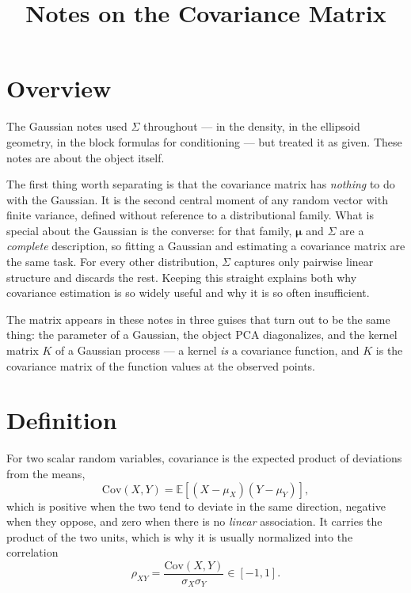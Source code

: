 \documentclass[conference]{IEEEtran}
\title{Notes on the Covariance Matrix}
\author{
\IEEEauthorblockN{Luis Mendez}
}
\begin{document}
\maketitle

\section*{Overview}
The Gaussian notes used $\Sigma$ throughout --- in the density, in the ellipsoid geometry, in the block formulas for conditioning --- but treated it as given. These notes are about the object itself.

The first thing worth separating is that the covariance matrix has \textit{nothing} to do with the Gaussian. It is the second central moment of any random vector with finite variance, defined without reference to a distributional family. What is special about the Gaussian is the converse: for that family, $\boldsymbol{\mu}$ and $\Sigma$ are a \textit{complete} description, so fitting a Gaussian and estimating a covariance matrix are the same task. For every other distribution, $\Sigma$ captures only pairwise linear structure and discards the rest. Keeping this straight explains both why covariance estimation is so widely useful and why it is so often insufficient.

The matrix appears in these notes in three guises that turn out to be the same thing: the parameter of a Gaussian, the object PCA diagonalizes, and the kernel matrix $K$ of a Gaussian process --- a kernel \textit{is} a covariance function, and $K$ is the covariance matrix of the function values at the observed points.

\section*{Definition}
For two scalar random variables, covariance is the expected product of deviations from the means,
\begin{equation}
    \mathrm{Cov}(X,Y) = \mathbb{E}\!\left[(X - \mu_X)(Y - \mu_Y)\right],
\end{equation}
which is positive when the two tend to deviate in the same direction, negative when they oppose, and zero when there is no \textit{linear} association. It carries the product of the two units, which is why it is usually normalized into the correlation
\begin{equation}
    \rho_{XY} = \frac{\mathrm{Cov}(X,Y)}{\sigma_X \sigma_Y} \in [-1,1].
\end{equation}
\end{document}
